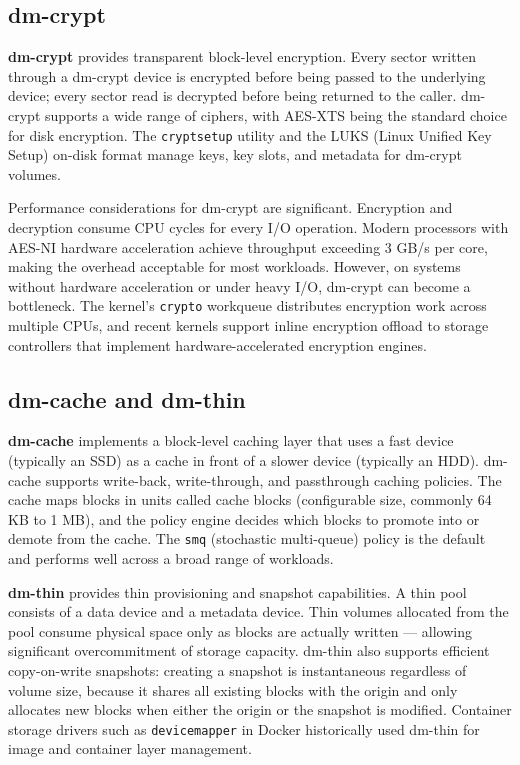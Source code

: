 \subsection{dm-crypt}

\textbf{dm-crypt} provides transparent block-level encryption. Every sector written through a dm-crypt device is encrypted before being passed to the underlying device; every sector read is decrypted before being returned to the caller. dm-crypt supports a wide range of ciphers, with AES-XTS being the standard choice for disk encryption. The \texttt{cryptsetup} utility and the LUKS (Linux Unified Key Setup) on-disk format manage keys, key slots, and metadata for dm-crypt volumes.

Performance considerations for dm-crypt are significant. Encryption and decryption consume CPU cycles for every I/O operation. Modern processors with AES-NI hardware acceleration achieve throughput exceeding 3 GB/s per core, making the overhead acceptable for most workloads. However, on systems without hardware acceleration or under heavy I/O, dm-crypt can become a bottleneck. The kernel's \texttt{crypto} workqueue distributes encryption work across multiple CPUs, and recent kernels support inline encryption offload to storage controllers that implement hardware-accelerated encryption engines.

\subsection{dm-cache and dm-thin}

\textbf{dm-cache} implements a block-level caching layer that uses a fast device (typically an SSD) as a cache in front of a slower device (typically an HDD). dm-cache supports write-back, write-through, and passthrough caching policies. The cache maps blocks in units called cache blocks (configurable size, commonly 64 KB to 1 MB), and the policy engine decides which blocks to promote into or demote from the cache. The \texttt{smq} (stochastic multi-queue) policy is the default and performs well across a broad range of workloads.

\textbf{dm-thin} provides thin provisioning and snapshot capabilities. A thin pool consists of a data device and a metadata device. Thin volumes allocated from the pool consume physical space only as blocks are actually written --- allowing significant overcommitment of storage capacity. dm-thin also supports efficient copy-on-write snapshots: creating a snapshot is instantaneous regardless of volume size, because it shares all existing blocks with the origin and only allocates new blocks when either the origin or the snapshot is modified. Container storage drivers such as \texttt{devicemapper} in Docker historically used dm-thin for image and container layer management.

